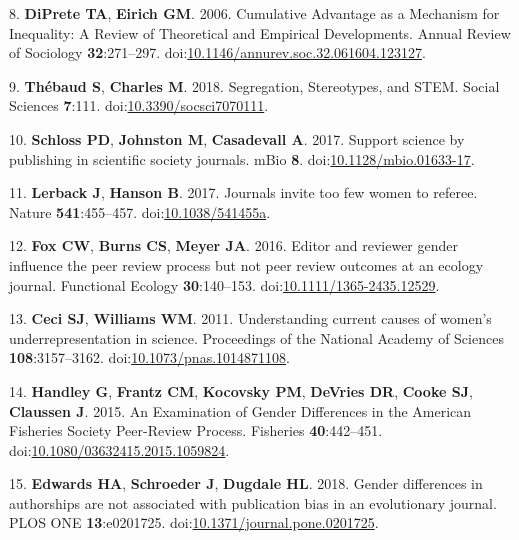 \documentclass[11pt,]{article}
\begin{document}
\hypertarget{ref-diprete_cumulative_2006}{}
8. \textbf{DiPrete TA}, \textbf{Eirich GM}. 2006. Cumulative Advantage
as a Mechanism for Inequality: A Review of Theoretical and Empirical
Developments. Annual Review of Sociology \textbf{32}:271--297.
doi:\href{https://doi.org/10.1146/annurev.soc.32.061604.123127}{10.1146/annurev.soc.32.061604.123127}.

\hypertarget{ref-thebaud_segregation_2018}{}
9. \textbf{Thébaud S}, \textbf{Charles M}. 2018. Segregation,
Stereotypes, and STEM. Social Sciences \textbf{7}:111.
doi:\href{https://doi.org/10.3390/socsci7070111}{10.3390/socsci7070111}.

\hypertarget{ref-Schloss2017}{}
10. \textbf{Schloss PD}, \textbf{Johnston M}, \textbf{Casadevall A}.
2017. Support science by publishing in scientific society journals. mBio
\textbf{8}.
doi:\href{https://doi.org/10.1128/mbio.01633-17}{10.1128/mbio.01633-17}.

\hypertarget{ref-lerback_journals_2017}{}
11. \textbf{Lerback J}, \textbf{Hanson B}. 2017. Journals invite too few
women to referee. Nature \textbf{541}:455--457.
doi:\href{https://doi.org/10.1038/541455a}{10.1038/541455a}.

\hypertarget{ref-fox_editor_2016}{}
12. \textbf{Fox CW}, \textbf{Burns CS}, \textbf{Meyer JA}. 2016. Editor
and reviewer gender influence the peer review process but not peer
review outcomes at an ecology journal. Functional Ecology
\textbf{30}:140--153.
doi:\href{https://doi.org/10.1111/1365-2435.12529}{10.1111/1365-2435.12529}.

\hypertarget{ref-ceci_understanding_2011}{}
13. \textbf{Ceci SJ}, \textbf{Williams WM}. 2011. Understanding current
causes of women's underrepresentation in science. Proceedings of the
National Academy of Sciences \textbf{108}:3157--3162.
doi:\href{https://doi.org/10.1073/pnas.1014871108}{10.1073/pnas.1014871108}.

\hypertarget{ref-handley_examination_2015}{}
14. \textbf{Handley G}, \textbf{Frantz CM}, \textbf{Kocovsky PM},
\textbf{DeVries DR}, \textbf{Cooke SJ}, \textbf{Claussen J}. 2015. An
Examination of Gender Differences in the American Fisheries Society
Peer-Review Process. Fisheries \textbf{40}:442--451.
doi:\href{https://doi.org/10.1080/03632415.2015.1059824}{10.1080/03632415.2015.1059824}.

\hypertarget{ref-edwards_gender_2018}{}
15. \textbf{Edwards HA}, \textbf{Schroeder J}, \textbf{Dugdale HL}.
2018. Gender differences in authorships are not associated with
publication bias in an evolutionary journal. PLOS ONE
\textbf{13}:e0201725.
doi:\href{https://doi.org/10.1371/journal.pone.0201725}{10.1371/journal.pone.0201725}.
\end{document}
